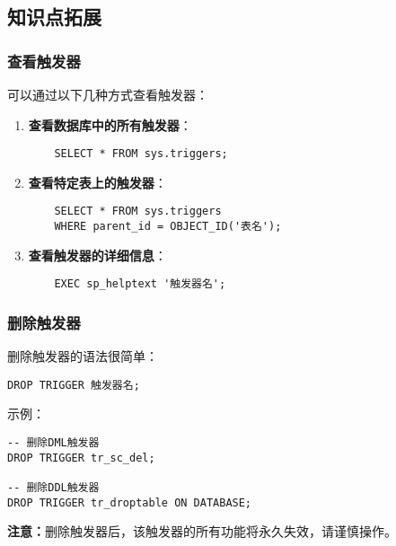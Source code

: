 \subsection{知识点拓展}

\subsubsection{查看触发器}

\qquad 可以通过以下几种方式查看触发器：

\begin{enumerate}
  \item \textbf{查看数据库中的所有触发器}：
    \begin{verbatim}
    SELECT * FROM sys.triggers;
    \end{verbatim}

  \item \textbf{查看特定表上的触发器}：
    \begin{verbatim}
    SELECT * FROM sys.triggers
    WHERE parent_id = OBJECT_ID('表名');
    \end{verbatim}

  \item \textbf{查看触发器的详细信息}：
    \begin{verbatim}
    EXEC sp_helptext '触发器名';
    \end{verbatim}
\end{enumerate}

\subsubsection{删除触发器}

\qquad 删除触发器的语法很简单：

\begin{mdframed}[backgroundcolor=gray!10]
\begin{verbatim}
DROP TRIGGER 触发器名;
\end{verbatim}
\end{mdframed}

\qquad 示例：
\begin{verbatim}
-- 删除DML触发器
DROP TRIGGER tr_sc_del;

-- 删除DDL触发器
DROP TRIGGER tr_droptable ON DATABASE;
\end{verbatim}

\textbf{注意：}删除触发器后，该触发器的所有功能将永久失效，请谨慎操作。
